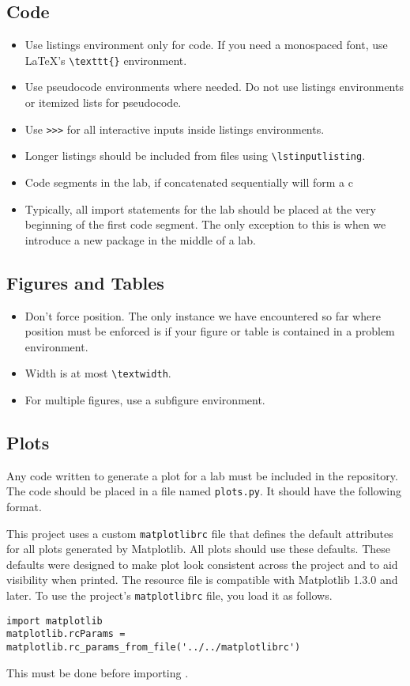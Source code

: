 \subsection{Code}
\begin{itemize}
\item Use listings environment only for code.
If you need a monospaced font, use \LaTeX's \texttt{\textbackslash texttt\{\}} environment.
\item Use pseudocode environments where needed.
Do not use listings environments or itemized lists for pseudocode.
\item Use \texttt{>>>} for all interactive inputs inside listings environments.
\item Longer listings should be included from files using \texttt{\textbackslash lstinputlisting}.
\item Code segments in the lab, if concatenated sequentially will form a c
\item Typically, all import statements for the lab should be placed at the very beginning of the first code segment.
The only exception to this is when we introduce a new package in the middle of a lab.
\end{itemize}

\subsection{Figures and Tables}
\begin{itemize}
\item Don't force position.
The only instance we have encountered so far where position must be enforced is if your figure or table is contained in a problem environment.
\item Width is at most \texttt{\textbackslash textwidth}.
\item For multiple figures, use a subfigure environment.
\end{itemize}


\subsection{Plots}
Any code written to generate a plot for a lab must be included in the repository.
The code should be placed in a file named \texttt{plots.py}.
It should have the following format.


This project uses a custom \texttt{matplotlibrc} file that defines the default attributes for all plots generated by Matplotlib.
All plots should use these defaults.
These defaults were designed to make plot look consistent across the project and to aid visibility when printed.
The resource file is compatible with Matplotlib 1.3.0 and later.
To use the project's \texttt{matplotlibrc} file, you load it as follows.
\begin{lstlisting}
import matplotlib
matplotlib.rcParams = matplotlib.rc_params_from_file('../../matplotlibrc')
\end{lstlisting}
This must be done before importing .

